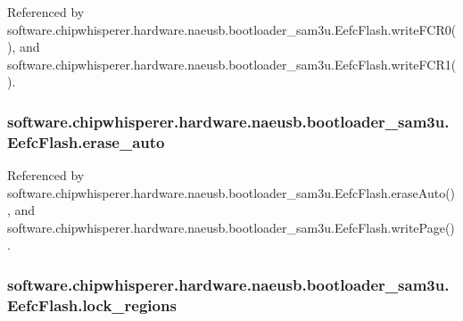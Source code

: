Referenced by software.\+chipwhisperer.\+hardware.\+naeusb.\+bootloader\+\_\+sam3u.\+Eefc\+Flash.\+write\+F\+C\+R0(), and software.\+chipwhisperer.\+hardware.\+naeusb.\+bootloader\+\_\+sam3u.\+Eefc\+Flash.\+write\+F\+C\+R1().

\hypertarget{classsoftware_1_1chipwhisperer_1_1hardware_1_1naeusb_1_1bootloader__sam3u_1_1EefcFlash_a1cc5a9208c7ab7f6aaad3ae69fceb265}{}
\subsubsection[{erase\+\_\+auto}]{\setlength{\rightskip}{0pt plus 5cm}software.\+chipwhisperer.\+hardware.\+naeusb.\+bootloader\+\_\+sam3u.\+Eefc\+Flash.\+erase\+\_\+auto}\label{classsoftware_1_1chipwhisperer_1_1hardware_1_1naeusb_1_1bootloader__sam3u_1_1EefcFlash_a1cc5a9208c7ab7f6aaad3ae69fceb265}


Referenced by software.\+chipwhisperer.\+hardware.\+naeusb.\+bootloader\+\_\+sam3u.\+Eefc\+Flash.\+erase\+Auto(), and software.\+chipwhisperer.\+hardware.\+naeusb.\+bootloader\+\_\+sam3u.\+Eefc\+Flash.\+write\+Page().

\hypertarget{classsoftware_1_1chipwhisperer_1_1hardware_1_1naeusb_1_1bootloader__sam3u_1_1EefcFlash_a8f9bd8efa75281b78a7f2c207f5b7750}{}
\subsubsection[{lock\+\_\+regions}]{\setlength{\rightskip}{0pt plus 5cm}software.\+chipwhisperer.\+hardware.\+naeusb.\+bootloader\+\_\+sam3u.\+Eefc\+Flash.\+lock\+\_\+regions}\label{classsoftware_1_1chipwhisperer_1_1hardware_1_1naeusb_1_1bootloader__sam3u_1_1EefcFlash_a8f9bd8efa75281b78a7f2c207f5b7750}



